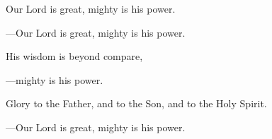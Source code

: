 \responsory
\begin{hangpar}

Our Lord is great, mighty is his power.

{\color{red}---\thinspace}Our Lord is great, mighty is his power.

\medskip His wisdom is beyond compare,

{\color{red}---\thinspace}mighty is his power.

\medskip Glory to the Father, and to the Son, and to the Holy Spirit.

{\color{red}---\thinspace}Our Lord is great, mighty is his power.
\end{hangpar}
